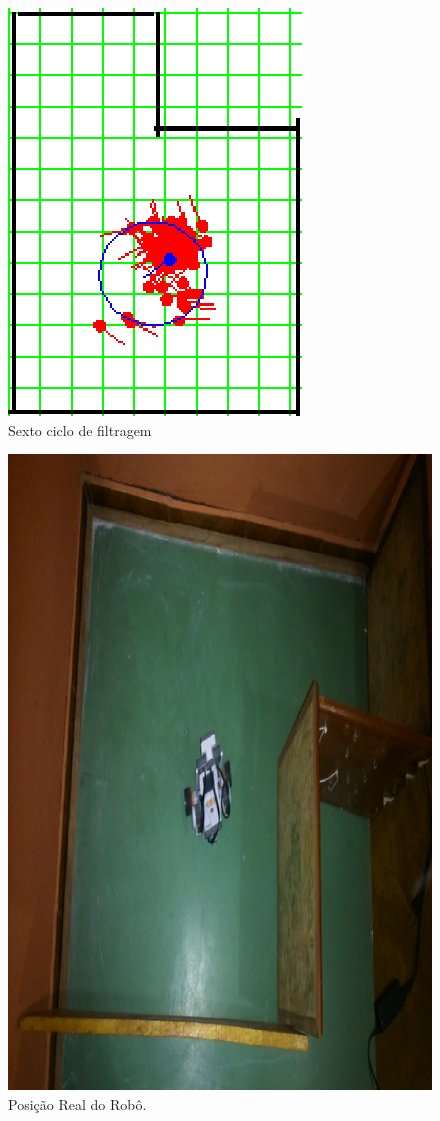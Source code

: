 \begin{figure}[H]
  \centering
  \includegraphics[scale=1]{figuras/cen2_ex3/7.eps}
  \caption[Sexto Ciclo de Filtragem]{Sexto ciclo de filtragem}
  \label{img:cen2_ex3_7}
\end{figure}

\begin{figure}[H]
  \centering
  \includegraphics[scale=1]{figuras/cen2_ex3/real.eps}
  \caption[Posição Real do Robô]{Posição Real do Robô.}
  \label{img:cen2_ex3_23}
\end{figure}


